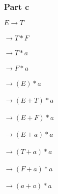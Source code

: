 \documentclass{article}%
\begin{document}
\subsubsection*{Part c}
$E \rightarrow T$\\
\\
$\rightarrow T * F$\\
\\
$\rightarrow T * a$\\
\\
$\rightarrow F * a$\\
\\
$\rightarrow (E) * a$\\
\\
$\rightarrow (E + T) * a$\\
\\
$\rightarrow (E + F) * a$\\
\\
$\rightarrow (E + a) * a$\\
\\
$\rightarrow (T + a) * a$\\
\\
$\rightarrow (F + a) * a$\\
\\
$\rightarrow (a + a) * a$\\
\\
\end{document}
